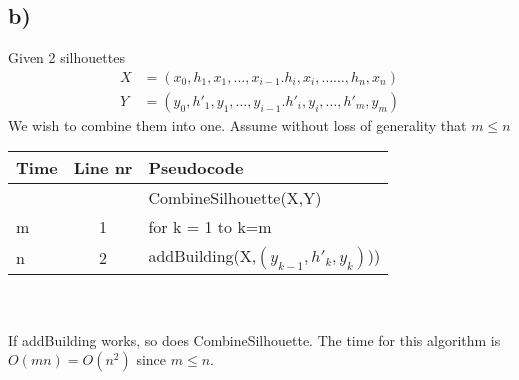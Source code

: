 \documentclass{article}
\theoremstyle{remark}
\numberwithin{equation}{section}
\begin{document}
	\subsection{b)}
	Given 2 silhouettes
	\begin{align}
	X&=(x_0,h_1,x_1,\dots,x_{i-1}.h_i,x_i,\dots\dots,h_n,x_n)\\
	Y&=(y_0,h'_1,y_1,\dots,y_{i-1}.h'_i,y_i,\dots,h'_m,y_m)
	\end{align}
	We wish to combine them into one. Assume without loss of generality that $m\leq n$\\
	\begin{tabular}{l | c | l}
		Time & Line nr & Pseudocode \\ \hline
		&&CombineSilhouette(X,Y)\\
		m & 1 & for k = 1 to k=m\\
		\indent n & 2 & \indent addBuilding(X,$(y_{k-1},h'_k,y_k)$))\\
	\end{tabular}\\\\
	If addBuilding works, so does CombineSilhouette. The time for this algorithm is $O(mn) = O(n^2)$ since $m\leq n$.
\end{document}
